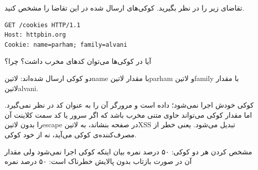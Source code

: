 

تقاضای زیر را در نظر بگیرید. کوکی‌های ارسال شده در این تقاضا را مشخص کنید.

\begin{latin}
\begin{verbatim}
GET /cookies HTTP/1.1
Host: httpbin.org
Cookie: name=parham; family=alvani
\end{verbatim}
\end{latin}

آیا در کوکی‌ها می‌توان کدهای مخرب داشت؟ چرا؟


\begin{پاسخ}

دو کوکی ارسال شده‌اند: ‌لاتین{name} با مقدار ‌لاتین{parham} و ‌لاتین{family} با مقدار ‌لاتین{alvani}.

کوکی خودش اجرا نمی‌شود؛ داده است و مرورگر آن را به عنوان کد در نظر نمی‌گیرد.
اما مقدار کوکی می‌تواند حاوی متنی مخرب باشد که اگر سرور یا کد سمت کلاینت آن را بدون ‌لاتین{escape} در صفحه بنشاند، به ‌لاتین{XSS} تبدیل می‌شود.
یعنی خطر از مصرف‌کننده‌ی کوکی می‌آید، نه از خود کوکی.

 مشخص کردن هر دو کوکی: ۵۰ درصد نمره
 بیان اینکه کوکی اجرا نمی‌شود ولی مقدار آن در صورت بازتاب بدون پالایش خطرناک است: ۵۰ درصد نمره

\end{پاسخ}
